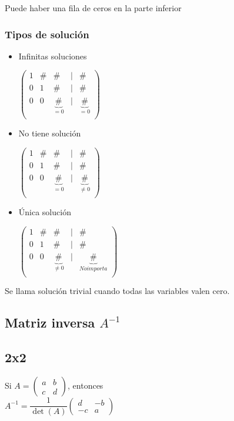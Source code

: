 Puede haber una fila de ceros en la parte inferior
\subsubsection{Tipos de solución}
\begin{itemize}
	\item Infinitas soluciones
	
	$\begin{pmatrix}
	1 & \# & \#&|&\#\\
	0 & 1 & \#&|&\#\\
	0 & 0 & \underbrace{\#}_{=0}&|&\underbrace{\#}_{=0}\\
	\end{pmatrix}$
	\item No tiene solución
	
	$\begin{pmatrix}
	1 & \# & \#&|&\#\\
	0 & 1 & \#&|&\#\\
	0 & 0 & \underbrace{\#}_{=0}&|&\underbrace{\#}_{\not=0}\\
	\end{pmatrix}$
	\item Única solución
	
	$\begin{pmatrix}
	1 & \# & \#&|&\#\\
	0 & 1 & \#&|&\#\\
	0 & 0 & \underbrace{\#}_{\not=0}&|&\underbrace{\#}_{No importa}\\
	\end{pmatrix}$
\end{itemize}


Se llama solución trivial cuando todas las variables valen cero.
\subsection{Matriz inversa $A^{-1}$}

\subsection{2x2}
Si $A=\begin{pmatrix}
a & b \\
c & d 
\end{pmatrix}$, entonces \\
$A^{-1}=\dfrac{1}{\det(A)}\begin{pmatrix}
d & -b \\
-c & a 
\end{pmatrix}$

